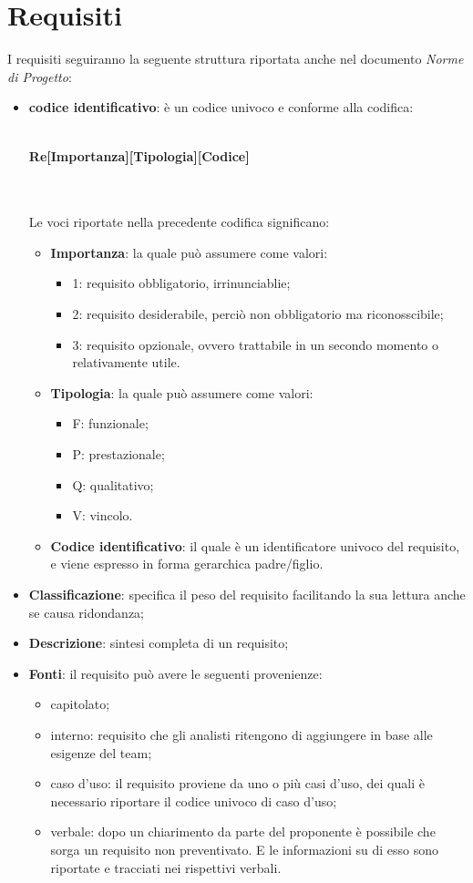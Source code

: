 \section{Requisiti}
I requisiti seguiranno la seguente struttura riportata anche nel documento \textit{Norme di Progetto}:
				\begin{itemize}
					\item \textbf{codice identificativo}: è un codice univoco e conforme alla codifica: \\ \\
					\centerline{\textbf{Re[Importanza][Tipologia][Codice]}} \\ \\
					Le voci riportate nella precedente codifica significano: 
					\begin{itemize}
						\item \textbf{Importanza}: la quale può assumere come valori:
						\begin{itemize}
							\item 1: requisito obbligatorio, irrinunciablie;
							\item 2: requisito desiderabile, perciò non obbligatorio ma riconosscibile;
							\item 3: requisito opzionale, ovvero trattabile in un secondo momento o relativamente utile.
						\end{itemize}
						\item \textbf{Tipologia}: la quale può assumere come valori:
						\begin{itemize}
							\item F: funzionale;
							\item P: prestazionale;
							\item Q: qualitativo;
							\item V: vincolo.
						\end{itemize}
						\item \textbf{Codice identificativo}: il quale è un identificatore univoco del requisito, e viene espresso in forma gerarchica padre/figlio.
					\end{itemize}
					\item \textbf{Classificazione}: specifica il peso del requisito facilitando la sua lettura anche se causa ridondanza;
					\item \textbf{Descrizione}: sintesi completa di un requisito;
					\item \textbf{Fonti}: il requisito può avere le seguenti provenienze:
					\begin{itemize}
						\item capitolato;
						\item interno: requisito che gli analisti ritengono di aggiungere in base alle esigenze del team;
						\item caso d'uso: il requisito proviene da uno o più casi d'uso, dei quali è necessario riportare il codice univoco di caso d'uso;
						\item verbale: dopo un chiarimento da parte del proponente è possibile che sorga un requisito non preventivato. E le informazioni su di esso sono riportate e tracciati nei rispettivi verbali.
					\end{itemize}
				\end{itemize} 
				\pagebreak
